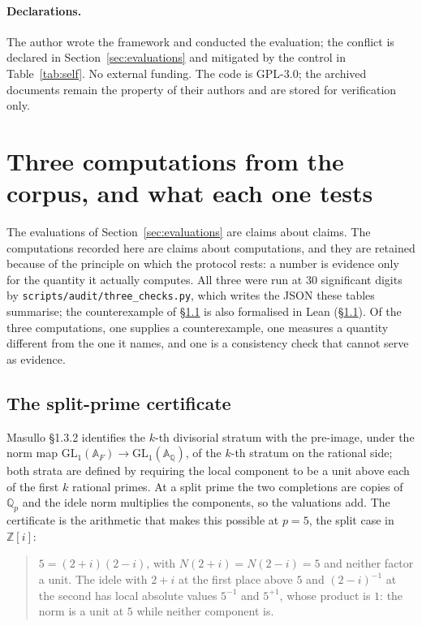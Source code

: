 \documentclass[11pt,a4paper]{article}
\begin{document}
\paragraph{Declarations.} The author wrote the framework and conducted the evaluation; the
conflict is declared in Section~\ref{sec:evaluations} and mitigated by the control in
Table~\ref{tab:self}. No external funding. The code is GPL-3.0; the archived documents remain
the property of their authors and are stored for verification only.

\section{Three computations from the corpus, and what each one tests}
\label{app:three}

The evaluations of Section~\ref{sec:evaluations} are claims about claims. The
computations recorded here are claims about computations, and they are retained because of the
principle on which the protocol rests: a number is evidence only for the quantity it actually
computes. All three were run at 30 significant digits by
\texttt{scripts/audit/three\_checks.py}, which writes the JSON these tables summarise; the
counterexample of \S\ref{app:split} is also formalised in Lean (\S\ref{app:split}). Of the three
computations, one supplies a counterexample, one measures a quantity different from the one it
names, and one is a consistency check that cannot serve as evidence.

\subsection{The split-prime certificate}
\label{app:split}

Masullo \S1.3.2 identifies the $k$-th divisorial stratum with the pre-image, under the norm
map $\mathrm{GL}_1(\mathbb{A}_F)\to\mathrm{GL}_1(\mathbb{A}_{\mathbb{Q}})$, of the $k$-th
stratum on the rational side; both strata are defined by requiring the local component to be a
unit above each of the first $k$ rational primes. At a split prime the two completions are
copies of $\mathbb{Q}_p$ and the idele norm multiplies the components, so the valuations add.
The certificate is the arithmetic that makes this possible at $p=5$, the split case in
$\mathbb{Z}[i]$:

\begin{quote}
$5=(2+i)(2-i)$, with $N(2+i)=N(2-i)=5$ and neither factor a unit. The idele with $2+i$ at the
first place above $5$ and $(2-i)^{-1}$ at the second has local absolute values $5^{-1}$ and
$5^{+1}$, whose product is $1$: the norm is a unit at $5$ while neither component is.
\end{quote}
\end{document}
